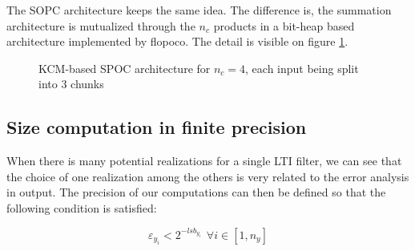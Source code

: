	The SOPC architecture keeps the same idea.
	The difference is, the summation architecture is mutualized through the $n_c$ products in a bit-heap based architecture implemented by flopoco.
	The detail is visible on figure \ref{fig:Overall architecture}.

\begin{figure}
  \begin{center}
\end{center}
\caption{KCM-based SPOC architecture for $n_c=4$, each input being split into 3 chunks  \label{fig:Overall architecture}}
\end{figure}

	\subsection{Size computation in finite precision}
	When there is many potential realizations for a single LTI filter, we can see that the choice of one realization
	among the others is very related to the error analysis in output.
	The precision of our computations can then be defined so that the following condition is satisfied:

	\begin{equation} \label{condition}
		\varepsilon_{y_i} < 2^{-lsb_{y_i}} \hspace{5pt} \forall i \in [1,n_y]
	\end{equation}

